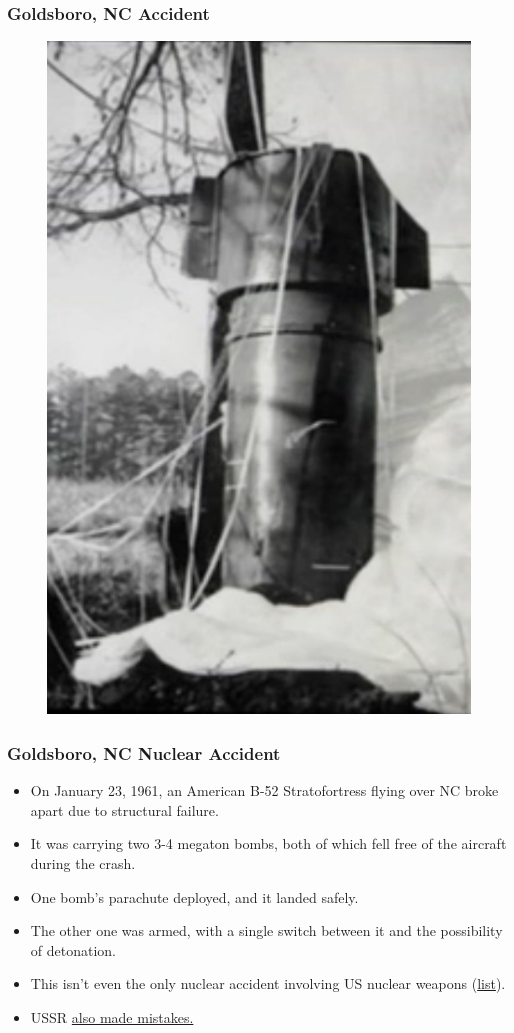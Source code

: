 \documentclass{beamer}
\begin{document}
\begin{frame} 
	\frametitle{\LARGE{Goldsboro, NC Accident}}
	\begin{figure}
		\includegraphics[height=.85\textheight,keepaspectratio]{./goldsboro.jpg}
	\end{figure}
\end{frame}

\begin{frame} 
\frametitle{\LARGE{Goldsboro, NC Nuclear Accident}}
\begin{itemize}
	\item On January 23, 1961, an American B-52 Stratofortress flying over NC broke apart due to structural failure. \pause
	\item It was carrying two 3-4 megaton bombs, both of which fell free of the aircraft during the crash. \pause
	\item One bomb's parachute deployed, and it landed safely. \pause
	\item The other one was armed, with a single switch between it and the possibility of detonation. \pause
	\item This isn't even the only nuclear accident involving US nuclear weapons (\href{https://en.wikipedia.org/wiki/List_of_military_nuclear_accidents}{list}).
	\item USSR \href{https://en.wikipedia.org/wiki/1983_Soviet_nuclear_false_alarm_incident}{also made mistakes.}
\end{itemize}
\end{frame}
\end{document}
